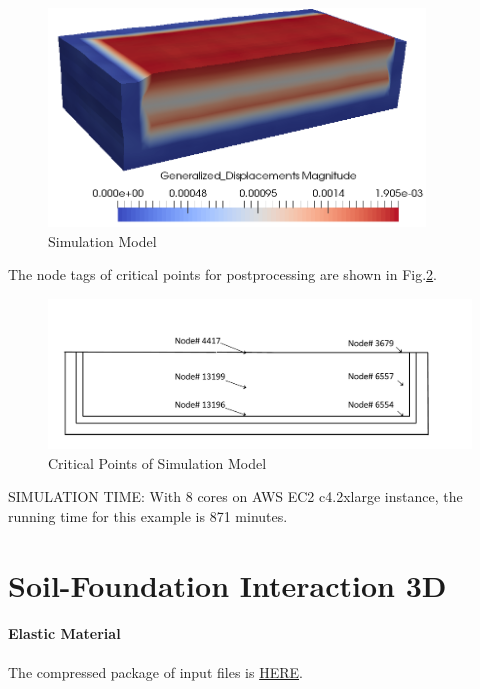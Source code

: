 \begin{figure}[H]
  \centering
  \includegraphics[width = 10cm]{./Figure-files/nonlinear_analysis_steps/free_field_3D/motion3D_DRM3D_free_field.png}
  \caption{Simulation Model}
  \label{fig_nonlinear_steps_D_motion_3D_model_results_free_field}
\end{figure}


The node tags of critical points for postprocessing are shown in Fig.\ref{fig_points_soil_foundation}.

\begin{figure}[H]
  \centering
  \includegraphics[width = 12cm]{./Figure-files/nonlinear_analysis_steps/free_field_3D/free_field_3D_node_location.pdf}
  \caption{Critical Points of Simulation Model}
  \label{fig_points_soil_foundation}
\end{figure}

SIMULATION TIME: With 8 cores on AWS EC2 c4.2xlarge instance, the running time for this example is 871 minutes.



\clearpage
\newpage
\section{Soil-Foundation Interaction 3D}
\label{foundation_3D}


\paragraph{Elastic Material}
The compressed package of input files is  
\href{https://github.com/yuan-energy/Real-ESSI-Short-Course-Examples/tree/master/short-course-examples/nonlinear_analysis_steps/soil-foundation/elastic/elastic.tgz?raw=true}{HERE}. 

